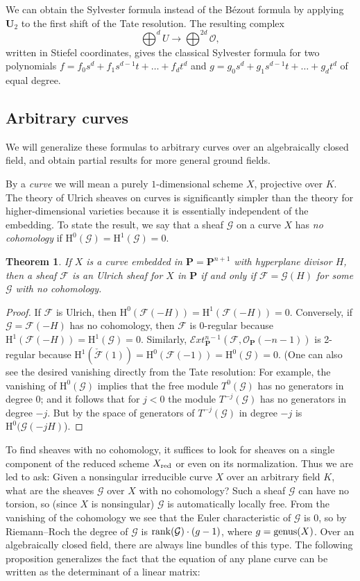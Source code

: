 \documentclass{jams-l}
\newtheorem{theorem}{Theorem}[section]
\theoremstyle{definition}
\theoremstyle{remark}
\newcommand{\cE} {{\mathcal E}}
\newcommand{\F}{{\mathcal F}}
\newcommand{\G}{{\mathcal G}}
\newcommand{\Hrm}{{\mathrm H}}
\newcommand{\Ocal}{{\mathcal O}}
\newcommand{\cO}{{\mathcal O}}
\newcommand{\PP}{{\mathbf P}}
\newcommand{\UU}{{\mathbf U}}
\newcommand{\rank}{\mathop{\rm rank}}
\begin{document}
We can obtain the 
Sylvester formula instead of the B\'ezout formula
by applying $\UU_2$ to the first shift of the Tate
resolution. The resulting complex 
\[ 
\bigoplus^d U \to \bigoplus^{2d} \cO, 
\]
written in Stiefel coordinates,
gives the classical Sylvester formula for two polynomials
$ f=f_0s^d+f_1s^{d-1}t+\ldots+f_dt^d$ and 
$g=g_0s^d+g_1s^{d-1}t+\ldots+g_dt^d$ of equal degree.

\subsection*{Arbitrary curves}
 
We will generalize these formulas to arbitrary curves over
an algebraically closed field, and obtain partial results for
more general ground fields.

By a {\it curve} we will mean a purely $1$-dimensional 
scheme $X$, projective over $K$.
The theory of Ulrich sheaves on curves is significantly simpler
than the theory for higher-dimensional varieties because
it is essentially independent of the embedding. To state the
result, we say that a sheaf $\G$ on a curve $X$ has 
{\it no cohomology\/}
if $\Hrm^0(\G)=\Hrm^1(\G)=0$.

\begin{theorem}\label{arbitrary curves} If $X$ is a curve embedded in
$\PP=\PP^{n+1}$ with hyperplane divisor $H$, then a sheaf
$\F$ is an Ulrich sheaf for $X$ in $\PP$ if and only if
$\F=\G(H)$ for some $\G$ with no cohomology.
\end{theorem}

\begin{proof} 
If $\F$ is Ulrich, then $\Hrm^0(\F(-H))=\Hrm^1(\F(-H))=0$. 
Conversely, if $\G=\F(-H)$ has no cohomology, then 
$\F$ is 0-regular because $\Hrm^1(\F(-H))=\Hrm^1(\G)=0$.
Similarly, $\cE xt^{n-1}_\PP(\F,\Ocal_\PP(-n-1))$ is
2-regular because $\Hrm^1(\check \F (1))=\Hrm^0(\F(-1))=\Hrm^0(\G)=0$. 
(One can also see the
desired vanishing
directly from the Tate resolution: For example, the vanishing of
$\Hrm^0(\G)$ implies that the free module
$T^0(\G)$ has no generators in degree 0; and it follows that
for $j<0$ the module $T^{-j}(\G)$ has no generators in
degree $-j$. But by 
\cite[Theorem 7.1]{Eisenbudetal.2001}
the space of
generators of $T^{-j}(\G)$ in
degree $-j$ is $\Hrm^0(\G(-jH)$).
\end{proof}

To find sheaves with no cohomology,
it suffices to look
for sheaves on a single component of the reduced scheme $X_{\rm red}$
or even on its normalization. Thus we are led to ask: Given a
nonsingular irreducible curve $X$ over an arbitrary field $K$,
what are the sheaves $\G$ over $X$ with no cohomology? Such a sheaf
$\G$ can have no torsion, so (since $X$ is nonsingular) 
$\G$ is automatically locally free. From the vanishing of the
cohomology we see that the Euler characteristic of $\G$ is 0,
so by Riemann--Roch the degree of $\G$ is $\rank(\G)\cdot (g-1)$,
where $g={\rm genus}(X)$. Over an algebraically closed field,
there are always line bundles of this type.
The following proposition
 generalizes the fact that the equation of any plane curve can be
written as the determinant of a linear matrix:
\end{document}
